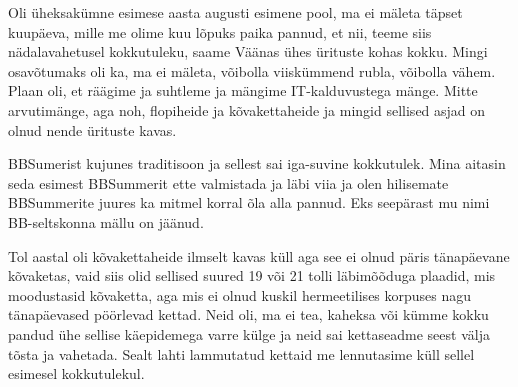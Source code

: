Oli üheksakümne esimese aasta augusti esimene pool, ma ei mäleta täpset 
kuupäeva, mille me olime kuu lõpuks paika pannud, et nii, teeme  siis nädalavahetusel 
kokkutuleku, saame Väänas ühes ürituste kohas kokku. Mingi osavõtumaks oli ka,  
ma ei mäleta, võibolla viiskümmend rubla,  võibolla vähem. Plaan oli, et räägime  ja suhtleme ja mängime   
IT-kalduvustega mänge. Mitte arvutimänge, aga noh, flopiheide ja 
kõvakettaheide ja mingid sellised asjad on olnud nende ürituste kavas. 

BBSumerist kujunes traditisoon ja sellest sai iga-suvine kokkutulek. Mina aitasin seda 
esimest BBSummerit ette valmistada ja läbi viia ja olen hilisemate BBSummerite juures ka mitmel korral õla alla pannud.
Eks seepärast mu nimi BB-seltskonna mällu on jäänud.


Tol aastal oli kõvakettaheide ilmselt kavas küll aga see ei olnud päris 
tänapäevane kõvaketas, vaid siis olid sellised suured 19 või 21 tolli 
läbimõõduga plaadid, mis moodustasid kõvaketta, aga mis ei olnud kuskil 
hermeetilises korpuses nagu tänapäevased pöörlevad kettad. Neid oli, ma ei tea, 
kaheksa või kümme kokku pandud ühe sellise käepidemega varre külge ja neid sai  
kettaseadme seest välja tõsta ja vahetada. Sealt lahti lammutatud kettaid me lennutasime küll sellel esimesel 
kokkutulekul. 

